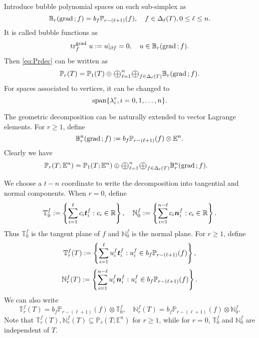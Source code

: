 \documentclass[10pt]{amsart}
\newcommand{\Oplus}{\ensuremath{\vcenter{\hbox{\scalebox{1.5}{$\oplus$}}}}}
\begin{document}
Introduce bubble polynomial spaces on each sub-simplex as
$$
\mathbb B_{r}({\rm grad\,}; f) = b_f\mathbb P_{r - (\ell +1)} (f), \quad f\in \Delta_{\ell}(T), 0\leq \ell \leq n.
$$
It is called bubble functions as
$$
\operatorname{tr}_f^{{\rm grad\,}} u := u|_{\partial f} = 0, \quad u\in \mathbb B_{r}({\rm grad\,}; f).
$$
Then \eqref{eq:Prdec} can be written as
\begin{equation}
\mathbb P_r(T) = \mathbb P_1(T)\oplus \Oplus_{\ell = 1}^n\Oplus_{f\in \Delta_{\ell}(T)} \mathbb B_{r}(\grad; f).
\end{equation}
For spaces associated to vertices, it can be changed to
$$
\operatorname*{span} \{\lambda_{i}^{r}, i=0, 1,\ldots, n\}.
$$

The geometric decomposition can be naturally extended to vector Lagrange elements. For $r\geq 1$, define 
\begin{equation*}
\mathbb B_{r}^n({\rm grad\,}; f) := b_f\mathbb P_{r - (\ell +1)} (f)\otimes \mathbb E^n.
\end{equation*}
Clearly we have
\begin{align}\label{eq:Prvecdec}
\mathbb P_r(T; \mathbb E^n)&= \mathbb P_1(T; \mathbb E^n)\oplus \Oplus_{\ell = 1}^n\Oplus_{f\in \Delta_{\ell}(T)} \mathbb B_{r}^n(\grad; f).
\end{align}

We choose a $t-n$ coordinate to write the decomposition into tangential and normal components. When $r = 0$, define
\begin{equation*}
\mathbb T^f_0 := \left \{\sum_{i=1}^{\ell} c_i \boldsymbol t_i^f:  c_i \in\mathbb R\right \},
\quad
\mathbb{N}^f_0 := \left \{\sum_{i=1}^{n-\ell} c_i \boldsymbol n_i^f:  c_i \in \mathbb R \right \}.
\end{equation*}
Thus $\mathbb T^f_0$ is the tangent plane of $f$ and $\mathbb N^f_0$ is the normal plane. 
For $r\geq 1$, define
\begin{equation*}%
\mathbb T^f_r( T) := \left \{\sum_{i=1}^{\ell} u_i^f \bs t_i^f: u_i^f \in b_f\mathbb P_{r - (\ell +1)} (f) \right \},
\end{equation*}
\begin{equation*}
\mathbb{N}^f_r( T) := \left \{\sum_{i=1}^{n-\ell} u_i^f \boldsymbol n_i^f:  u_i^f \in b_f\mathbb P_{r - (\ell +1)} (f) \right \}.
\end{equation*}
We can also write 
$$
\mathbb T^f_r(T) = b_f\mathbb P_{r - (\ell +1)} (f)\otimes \mathbb T_0^f, \quad \mathbb N^f_r( T) = b_f\mathbb P_{r - (\ell +1)} (f)\otimes \mathbb N_0^f.
$$
Note that $\mathbb T^f_r( T), \mathbb N^f_r( T)\subseteq \mathbb P_r(T;\mathbb E^n)$ for $r\geq 1$, while for $r=0$, $\mathbb T_0^f$ and $\mathbb N_0^f$ are independent of $T$. 
\end{document}
